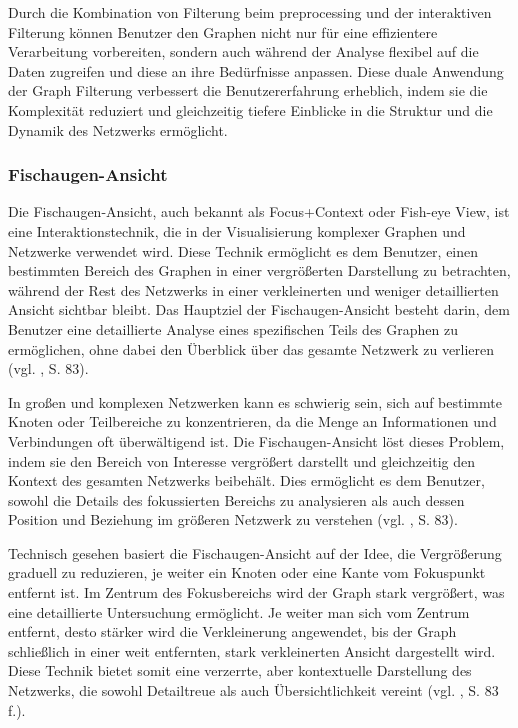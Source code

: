 Durch die Kombination von Filterung beim preprocessing und der interaktiven Filterung können Benutzer den Graphen nicht nur für eine effizientere Verarbeitung vorbereiten, sondern auch während der Analyse flexibel auf die Daten zugreifen und diese an ihre Bedürfnisse anpassen. Diese duale Anwendung der Graph Filterung verbessert die Benutzererfahrung erheblich, indem sie die Komplexität reduziert und gleichzeitig tiefere Einblicke in die Struktur und die Dynamik des Netzwerks ermöglicht.

\subsubsection{Fischaugen-Ansicht}

Die Fischaugen-Ansicht, auch bekannt als Focus+Context oder Fish-eye View, ist eine Interaktionstechnik, die in der Visualisierung komplexer Graphen und Netzwerke verwendet wird. Diese Technik ermöglicht es dem Benutzer, einen bestimmten Bereich des Graphen in einer vergrößerten Darstellung zu betrachten, während der Rest des Netzwerks in einer verkleinerten und weniger detaillierten Ansicht sichtbar bleibt. Das Hauptziel der Fischaugen-Ansicht besteht darin, dem Benutzer eine detaillierte Analyse eines spezifischen Teils des Graphen zu ermöglichen, ohne dabei den Überblick über das gesamte Netzwerk zu verlieren (vgl. \cite{fisheye:Sarkar}, S. 83).

In großen und komplexen Netzwerken kann es schwierig sein, sich auf bestimmte Knoten oder Teilbereiche zu konzentrieren, da die Menge an Informationen und Verbindungen oft überwältigend ist. Die Fischaugen-Ansicht löst dieses Problem, indem sie den Bereich von Interesse vergrößert darstellt und gleichzeitig den Kontext des gesamten Netzwerks beibehält. Dies ermöglicht es dem Benutzer, sowohl die Details des fokussierten Bereichs zu analysieren als auch dessen Position und Beziehung im größeren Netzwerk zu verstehen (vgl. \cite{fisheye:Sarkar}, S. 83).

Technisch gesehen basiert die Fischaugen-Ansicht auf der Idee, die Vergrößerung graduell zu reduzieren, je weiter ein Knoten oder eine Kante vom Fokuspunkt entfernt ist. Im Zentrum des Fokusbereichs wird der Graph stark vergrößert, was eine detaillierte Untersuchung ermöglicht. Je weiter man sich vom Zentrum entfernt, desto stärker wird die Verkleinerung angewendet, bis der Graph schließlich in einer weit entfernten, stark verkleinerten Ansicht dargestellt wird. Diese Technik bietet somit eine verzerrte, aber kontextuelle Darstellung des Netzwerks, die sowohl Detailtreue als auch Übersichtlichkeit vereint (vgl. \cite{fisheye:Sarkar}, S. 83 f.).

